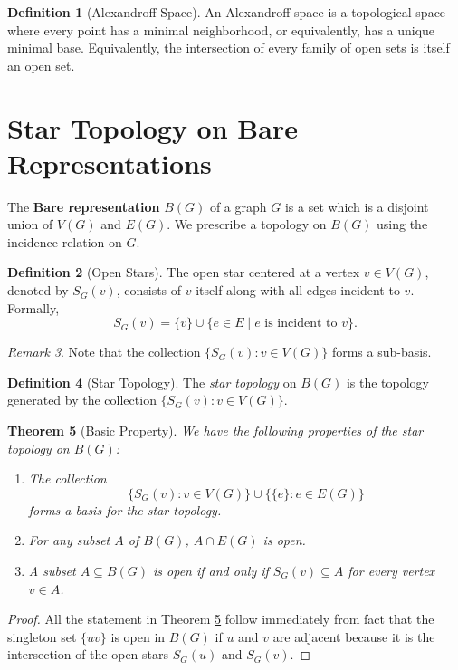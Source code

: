 \documentclass{amsart}
\newtheorem{theorem}{Theorem}[section]
\theoremstyle{definition}
\newtheorem{definition}[theorem]{Definition}
\theoremstyle{remark}
\newtheorem{remark}[theorem]{Remark}
\numberwithin{equation}{section}
\begin{document}
	\begin{definition}[Alexandroff Space]
		An Alexandroff space is a topological space where every point has a
		minimal
		neighborhood, or equivalently, has a unique minimal base. Equivalently, the
		intersection of every family of open sets is itself an open set.
		\cite{Arenas,JafarianAmiriJafarzadeh2013}
	\end{definition}
	
	
	\section{Star Topology on Bare Representations}
	\label{StarTopo:sec}
	The \textbf{Bare representation} \( B(G) \) of a graph \( G \) is a set which is a disjoint
	union of \( V(G) \) and \( E(G) \). We prescribe a topology on \( B(G) \)
	using the incidence relation on \( G \).
	
	\begin{definition}[Open Stars]
		The open star centered at a vertex \( v \in V(G) \), denoted by \( S_G(v)
		\), consists of \( v
		\) itself along with all edges incident to \( v \). Formally,
		\[ S_G(v) = \{v\} \cup \{e \in E \mid e \text{ is incident to } v\}. \]
	\end{definition}
	
	\begin{remark}
		Note that the collection \(\{S_G(v): v \in V(G)\}\) forms a sub-basis.
	\end{remark}
	
	\begin{definition}[Star Topology]
		The \textit{star topology} on \( B(G) \) is the topology generated by the
		collection \(\{S_G(v): v \in V(G)\}\).
	\end{definition}
	
	\begin{theorem}[Basic Property]
		\label{BasicProperty}
		We have the following properties of the star topology on \(B(G)\):
		\begin{enumerate}
			\item The collection
			\[
			\{S_G(v): v \in V(G)\} \cup \{\{e\}: e \in E(G)\}
			\]
			forms a basis for the star topology.
			\item For any subset \(A\) of \(B(G)\), \(A \cap E(G)\) is open.
			\item A subset \(A \subseteq B(G)\) is open if and only if
			\(S_G(v) \subseteq A\) for every vertex \(v \in A\).
		\end{enumerate}
	\end{theorem}
	\begin{proof}
		All the statement in Theorem \ref{BasicProperty} follow immediately from
		fact that the singleton set \(\{uv\}\) is open in \( B(G) \) if \(u\) and \(v\)
		are adjacent because it is the intersection of the open stars \( S_G(u)\) and \(
		S_G(v) \).
	\end{proof}
	
\end{document}
